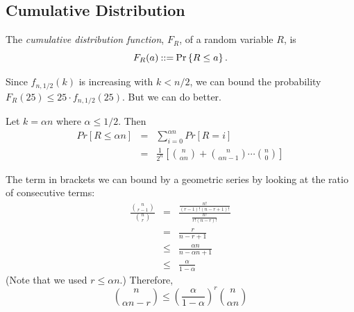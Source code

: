 \documentclass[11pt,twoside]{article}
\begin{document}
\subsection{Cumulative Distribution}
The {\em cumulative distribution function}, $F_R$, of a random variable
$R$, is
\[
F_R(a) \mathbin{::=} \mathop{\textup{Pr}}\nolimits\left\{R \le a\right\}.
\]

Since $f_{n,1/2}(k)$ is increasing with $k<n/2$, we can bound the
probability $F_R(25) \le 25\cdot f_{n,1/2}(25)$.  But we can do better.

Let $k = \alpha n$ where $\alpha \le 1/2$. Then
\begin{eqnarray*}
Pr[R\leq \alpha n]
  &=& \sum_{i=0}^{\alpha n} Pr[R=i] \\
  &=& \frac{1}{2^n}\left[ \binom{n}{\alpha n}+\binom{n}{\alpha n - 1}
  \cdots \binom{n}{0} \right]
\end{eqnarray*}

The term in brackets we can bound by a geometric series by looking
at the ratio of consecutive terms:
\begin{eqnarray*}
\frac{\binom{n}{r-1}}{\binom{n}{r}} &=&
\frac{\frac{n!}{(r-1)!(n-r+1)!}}{\frac{n!}{r!(n-r)!}}\\
&=& \frac{r}{n-r+1}\\
&\leq& \frac{\alpha n}{n- \alpha n + 1}\\
&\leq& \frac{\alpha}{1-\alpha}
\end{eqnarray*}
(Note that we used $r \leq \alpha n$.)
Therefore,
\[
\binom{n}{\alpha n - r} \le
\left(\frac{\alpha}{1-\alpha}\right)^r\binom{n}{\alpha n}
\]
\end{document}
